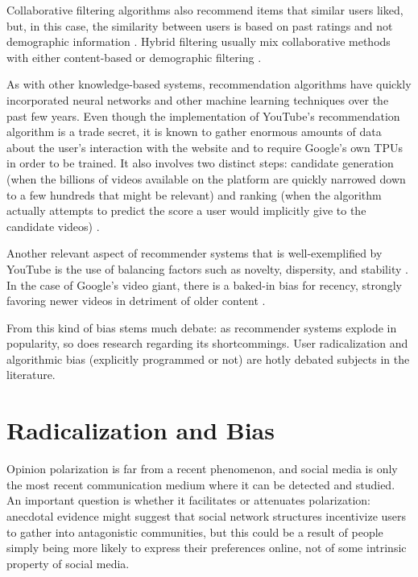 Collaborative filtering algorithms also recommend items that similar users
liked, but, in this case, the similarity between users is based on past ratings
and not demographic information \citep{ricci_introduction_2011}. Hybrid
filtering usually mix collaborative methods with either content-based or
demographic filtering \citep{ricci_introduction_2011}.

As with other knowledge-based systems, recommendation algorithms have quickly
incorporated neural networks and other machine learning techniques over the past
few years. Even though the implementation of YouTube's recommendation algorithm
is a trade secret, it is known to gather enormous amounts of data about the
user's interaction with the website and to require Google's own TPUs in order to
be trained. It also involves two distinct steps: candidate generation (when the
billions of videos available on the platform are quickly narrowed down to a few
hundreds that might be relevant) and ranking (when the algorithm actually
attempts to predict the score a user would implicitly give to the candidate
videos) \citep{}.

Another relevant aspect of recommender systems that is well-exemplified by
YouTube is the use of balancing factors such as novelty, dispersity, and
stability \citep{zhao_recommending_2019}. In the case of Google's video giant,
there is a baked-in bias for recency, strongly favoring newer videos in
detriment of older content \citep{zhao_recommending_2019}.

From this kind of bias stems much debate: as recommender systems explode in
popularity, so does research regarding its shortcommings. User radicalization
and algorithmic bias (explicitly programmed or not) are hotly debated subjects
in the literature.

\section{Radicalization and Bias}
\label{sec:radicalization_bias}

Opinion polarization is far from a recent phenomenon, and social media is only
the most recent communication medium where it can be detected and studied. An
important question is whether it facilitates or attenuates polarization:
anecdotal evidence might suggest that social network structures incentivize
users to gather into antagonistic communities, but this could be a result of
people simply being more likely to express their preferences online, not of some
intrinsic property of social media.

